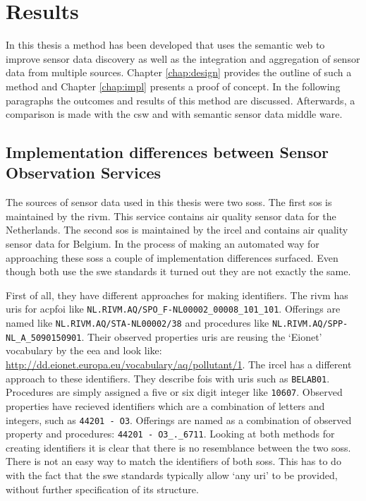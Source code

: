 

\chapter{Results}
\label{chap:results}

In this thesis a method has been developed that uses the semantic web to improve sensor data discovery as well as the integration and aggregation of sensor data from multiple sources. Chapter \ref{chap:design} provides the outline of such a method and Chapter \ref{chap:impl} presents a proof of concept. In the following paragraphs the outcomes and results of this method are discussed. Afterwards, a comparison is made with the \acf{csw} and with semantic sensor data middle ware. 

\section{Implementation differences between Sensor Observation Services}
\label{par:differences}
The sources of sensor data used in this thesis were two \aclp{sos}. The first \ac{sos} is maintained by the \acf{rivm}. This service contains air quality sensor data for the Netherlands. The second \ac{sos} is maintained by the \ac{ircel} and contains air quality sensor data for Belgium. In the process of making an automated way for approaching these \aclp{sos} a couple of implementation differences surfaced. Even though both use the \ac{swe} standards it turned out they are not exactly the same. 

\begin{sloppypar}
	First of all, they have different approaches for making identifiers. The \ac{rivm} has \acp{uri} for acp{foi} like \texttt{NL.RIVM.AQ/SPO\_F-NL00002\_00008\_101\_101}. Offerings are named like \texttt{NL.RIVM.AQ/STA-NL00002/38} and procedures like \texttt{NL.RIVM.AQ/SPP-NL\_A\_5090150901}. Their observed properties \acp{uri} are reusing the `Eionet' vocabulary by the \ac{eea} and look like: \url{http://dd.eionet.europa.eu/vocabulary/aq/pollutant/1}. The \ac{ircel} has a different approach to these identifiers. They describe \acp{foi} with \acp{uri} such as \texttt{BELAB01}. Procedures are simply assigned a five or six digit integer like \texttt{10607}. Observed properties have recieved identifiers which are a combination of letters and integers, such as \texttt{44201 - O3}. Offerings are named as a combination of observed property and procedures: \texttt{44201 - O3\_.\_6711}. Looking at both methods for creating identifiers it is clear that there is no resemblance between the two \aclp{sos}. There is not an easy way to match the identifiers of both \aclp{sos}. This has to do with the fact that the \ac{swe} standards typically allow `any \ac{uri}' to be provided, without further specification of its structure. 
\end{sloppypar}

